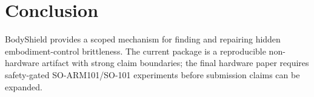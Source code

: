 \documentclass[10pt,conference]{IEEEtran}
\begin{document}
\section{Conclusion}
BodyShield provides a scoped mechanism for finding and repairing hidden embodiment-control brittleness. The current package is a reproducible non-hardware artifact with strong claim boundaries; the final hardware paper requires safety-gated SO-ARM101/SO-101 experiments before submission claims can be expanded.



\end{document}
